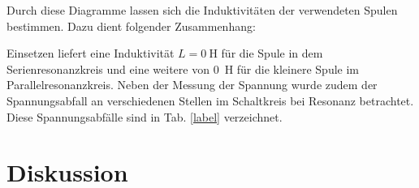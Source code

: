 	
	Durch diese Diagramme lassen sich die Induktivitäten der verwendeten Spulen bestimmen.
	Dazu dient folgender Zusammenhang:
	
	
	Einsetzen liefert eine Induktivität $L = \SI{0}{\henry}$ für die Spule in dem Serienresonanzkreis und eine weitere von \SI{0}{\henry} für die kleinere Spule im Parallelresonanzkreis. %
	Neben der Messung der Spannung wurde zudem der Spannungsabfall an verschiedenen Stellen im Schaltkreis bei Resonanz betrachtet.
	Diese Spannungsabfälle sind in Tab. \ref{label} verzeichnet. %
	
	
\section{Diskussion}




